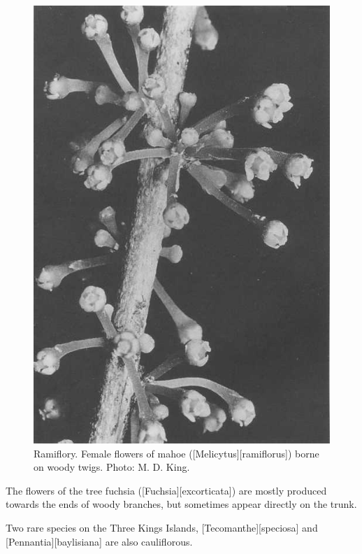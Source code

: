 \begin{figure}[htb]
\begin{minipage}[t]{0.37\textwidth}
    	\includegraphics[width=\textwidth]{graphics/figure17mahoe.jpg}
    	\caption[Ramiflory.
    	Female flowers of mahoe]{Ramiflory.
    	Female flowers of mahoe ([Melicytus][ramiflorus]) borne on woody twigs.
    	Photo:  M. D. King.}%
    	\label{fig:17mahoe}
	\end{minipage}
\end{figure}

The flowers of the tree fuchsia ([Fuchsia][excorticata]) are mostly produced towards the ends of woody branches, but sometimes appear directly on the trunk.

Two rare species on the Three Kings Islands, [Tecomanthe][speciosa] and [Pennantia][baylisiana] are also cauliflorous.

